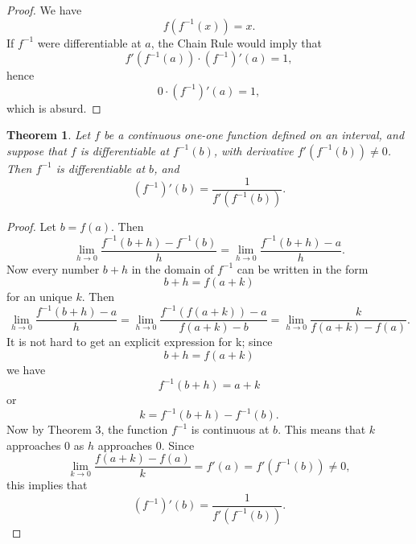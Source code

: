 \documentclass{article}
\newtheorem{theorem}{Theorem}
\begin{document}
\begin{proof}
  We have \begin{equation*}
    f(f^{-1}(x)) = x.
  \end{equation*} If $f^{-1}$ were differentiable at $a$, the Chain Rule would
  imply that \begin{equation*}
    f'(f^{-1}(a)) \cdot (f^{-1})'(a) = 1,
  \end{equation*} hence \begin{equation*}
    0 \cdot (f^{-1})'(a) = 1,
  \end{equation*} which is absurd.
\end{proof}

\begin{theorem}
  Let $f$ be a continuous one-one function defined on an interval, and suppose
  that $f$ is differentiable at $f^{-1}(b)$, with derivative $f'(f^{-1}(b))
  \neq 0$. Then $f^{-1}$ is differentiable at $b$, and \begin{equation*}
    (f^{-1})'(b) = \frac{1}{f'(f^{-1}(b))}.
  \end{equation*}
\end{theorem}

\begin{proof}
  Let $b = f(a)$. Then \begin{equation*}
    \lim_{h \rightarrow 0}\frac{f^{-1}(b + h) - f^{-1}(b)}{h} = \lim_{h
    \rightarrow 0}\frac{f^{-1}(b + h) - a}{h}.
  \end{equation*} Now every number $b + h$ in the domain of $f^{-1}$ can be
  written in the form \begin{equation*}
    b + h = f(a + k)
  \end{equation*} for an unique $k$. Then \begin{equation*}
    \lim_{h \rightarrow 0}\frac{f^{-1}(b + h) - a}{h} = \lim_{h \rightarrow 0}
      \frac{f^{-1}(f(a + k)) - a}{f(a + k) - b} = \lim_{h \rightarrow 0}
      \frac{k}{f(a + k) - f(a)}.
  \end{equation*} It is not hard to get an explicit expression for k; since
  \begin{equation*}
    b + h = f(a + k)
  \end{equation*} we have \begin{equation*}
    f^{-1}(b + h) = a + k
  \end{equation*} or \begin{equation*}
    k = f^{-1}(b + h) - f^{-1}(b).
  \end{equation*} Now by Theorem 3, the function $f^{-1}$ is continuous at $b$.
  This means that $k$ approaches 0 as $h$ approaches 0. Since \begin{equation*}
    \lim_{k \rightarrow 0}\frac{f(a + k) - f(a)}{k} = f'(a) = f'(f^{-1}(b))
      \neq 0,
  \end{equation*} this implies that \begin{equation*}
    (f^{-1})'(b) = \frac{1}{f'(f^{-1}(b))}.
  \end{equation*}
\end{proof}
\end{document}

